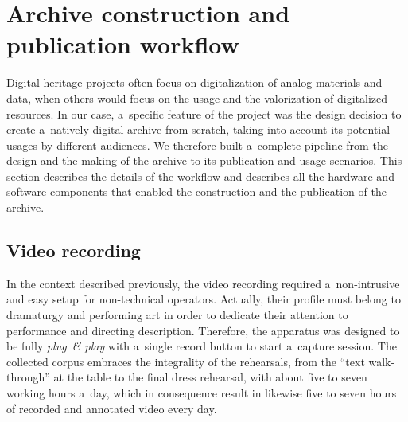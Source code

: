\documentclass[conference]{IEEEtran}
\newcommand{\todo}[1]{\noindent\textcolor{red}{{\bf \{ToDo} #1{\bf \}}}}
\begin{document}
%
%

\section{Archive construction and publication workflow}
\label{sec:workflow}


Digital heritage projects often focus on digitalization of analog materials and data,
when others would focus on the usage and the valorization of digitalized resources.
In our case, a~specific feature of the project was the design decision to create a~natively 
digital archive from scratch,  taking into account its potential usages by different audiences.
We therefore built a~complete pipeline from the design and the making of the archive
to its publication and usage scenarios. This section describes the details of the workflow 
and describes all the hardware and software components that enabled  the construction 
and the publication  of the archive.

\subsection{Video recording}
In the context described previously, the video recording required a~non-intrusive and easy setup for non-technical operators. Actually, their profile must belong to dramaturgy and performing art in order to dedicate their attention to performance and directing description. Therefore, the apparatus was designed to be fully \emph{plug\ \& play} with a~single record button to start a~capture session.
The collected corpus embraces the integrality of the rehearsals, from the ``text walk-through'' at the table to the final dress rehearsal, with about five to seven working hours a~day, which in consequence result in likewise five to seven hours of recorded and annotated video every day.
\end{document}
